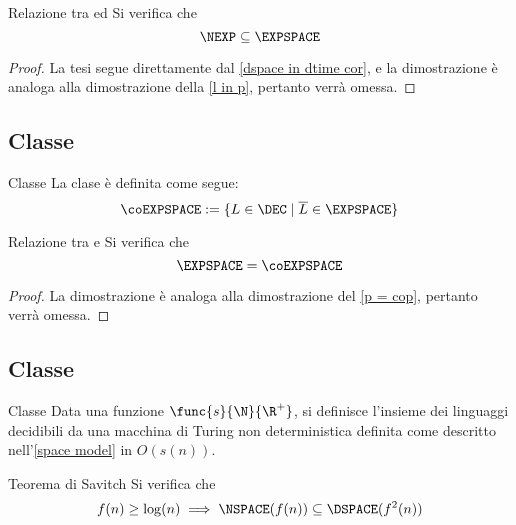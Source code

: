 \documentclass[a4paper, 12pt]{report}
\begin{document}
    \begin{framedprop}[label={nexp in expspace}]{Relazione tra \NEXP ed \EXPSPACE}
        Si verifica che $$\NEXP \subseteq \EXPSPACE$$
    \end{framedprop}

    \begin{proof}
        La tesi segue direttamente dal \cref{dspace in dtime cor}, e la dimostrazione è analoga alla dimostrazione della \cref{l in p}, pertanto verrà omessa.
    \end{proof}

    \subsection{Classe \coEXPSPACE}

    \begin{frameddefn}{Classe \coEXPSPACE}
        La clase \coEXPSPACE è definita come segue: $$\coEXPSPACE := \{L \in \DEC \mid \overline L \in \EXPSPACE\}$$
    \end{frameddefn}

    \begin{framedthm}{Relazione tra \EXPSPACE e \coEXPSPACE}
        Si verifica che $$\EXPSPACE = \coEXPSPACE$$
    \end{framedthm}

    \begin{proof}
        La dimostrazione è analoga alla dimostrazione del \cref{p = cop}, pertanto verrà omessa.
    \end{proof}

    \subsection{Classe \NSPACE}
    
    \begin{frameddefn}{Classe \NSPACE}
        Data una funzione $\func{s}{\N}{\R^+}$, si definisce  l'insieme dei linguaggi decidibili da una macchina di Turing non deterministica definita come descritto nell'\cref{space model} in $O(s(n))$.
    \end{frameddefn}

    \begin{framedthm}[label={savitch}]{Teorema di Savitch}
        Si verifica che $$f(n) \geq \log(n) \implies \NSPACE(f(n)) \subseteq \DSPACE(f^2(n))$$
    \end{framedthm}
\end{document}
